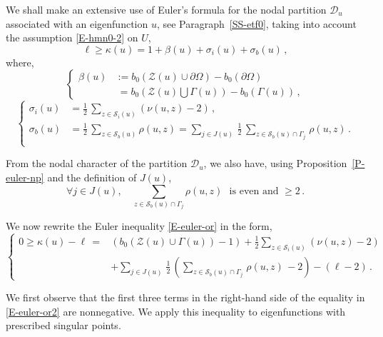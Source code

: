 \documentclass[12pt,a4paper]{amsart}
\theoremstyle{plain} %
\theoremstyle{definition}
\numberwithin{equation}{section}
\numberwithin{figure}{section}
\numberwithin{table}{section}
\newcommand{\cD}{\mathcal{D}}
\newcommand{\cS}{\mathcal{S}}
\newcommand{\cZ}{\mathcal{Z}}
\begin{document}
We shall make an extensive use of Euler's formula for the nodal partition $\cD_u$ associated with an eigenfunction $u$, see Paragraph~\ref{SS-etf0}, taking into account the assumption \eqref{E-hmn0-2} on $U$,
%
\begin{equation}\label{E-euler-or}
\ell \ge \kappa(u) = 1 + \beta(u) + \sigma_i(u) + \sigma_b(u)\,,
\end{equation}
%
where,
%
\begin{equation}\label{E-hmn0-8}
\left\{
\begin{array}{ll}
\beta(u) & := b_0(\cZ(u) \cup \partial \Omega) - b_0(\partial \Omega) \\[5pt]
& ~= b_0\left(\cZ(u) \bigcup \Gamma(u)\right) - b_0(\Gamma(u))\,,
\end{array}
\right.
\end{equation}
%
\begin{equation}\label{E-hmn0-10}
\left\{
\begin{array}{ll}
\sigma_i(u) &= \frac 12\, \sum_{z \in \cS_i(u)} \left( \nu(u,z) - 2 \right)\,,\\[5pt]
\sigma_b(u) &= \frac 12\, \sum_{z \in \cS_b(u)} \rho(u,z) = \sum_{j \in J(u)} \, \frac 12 \, \sum_{z\in \cS_b(u) \cap \Gamma_j\,} \rho(u,z)\,.\\[5pt]
\end{array}
\right.
\end{equation}

From the nodal character of the partition $\cD_u$, we also have, using Proposition~\ref{P-euler-np} and the definition of $J(u)$,
%
\begin{equation}\label{E-hmn0-12}
\forall j \in J(u), \quad \sum_{z \in \cS_b(u)\cap \Gamma_j}\rho(u,z) \text{~~is even and~} \ge 2\,.
\end{equation}

We now rewrite  the Euler inequality \eqref{E-euler-or} in the form,
%
\begin{equation}\label{E-euler-or2}
\left\{
\begin{array}{ll}
0 \geq  \kappa(u) - \ell  \,  = &\left( b_0(\cZ(u) \cup \Gamma(u))-1\right)+ \frac 12 \sum_{z \in \cS_i(u)} (\nu(u,z)-2)\\[5pt]
& + \sum_{j \in J(u)\,} \frac 12 \, \left( \sum_{z\in \cS_b(u) \cap
\Gamma_j\,} \rho(u,z) \, - 2 \right) - (\ell - 2)\,.
\end{array}
\right.
\end{equation}

We first observe that the first three terms in the right-hand side of the equality in \eqref{E-euler-or2} are nonnegative. We apply this inequality to  eigenfunctions with prescribed singular points.\medskip
\end{document}
